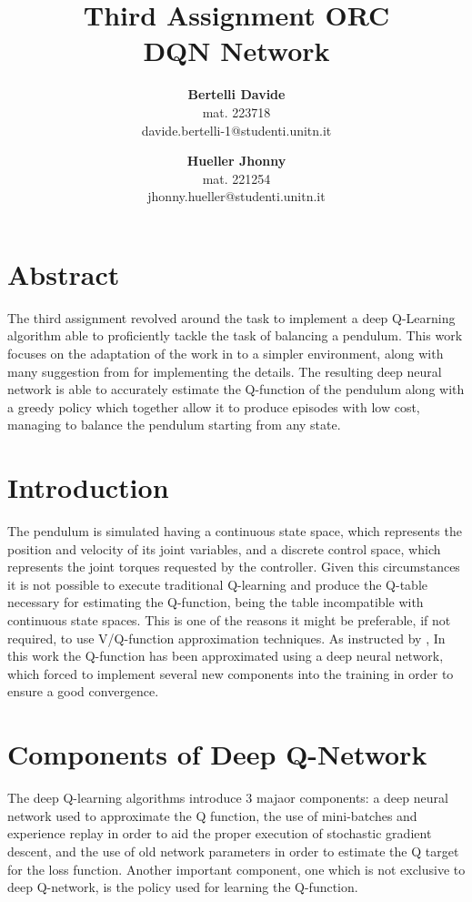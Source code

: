 \documentclass[twocolumn, a4paper]{article}
\begin{document}
\setlength{\textfloatsep}{0.3cm}
\setlength{\floatsep}{0.3cm}
\title{
	   \LARGE\textbf{Third Assignment ORC\\DQN Network}
	   \vspace{1cm}
	  }
\author{
		\textbf{Bertelli Davide} \\
		mat. 223718 \\
		davide.bertelli-1@studenti.unitn.it
		\and
		\textbf{Hueller Jhonny} \\
		mat. 221254\\
		jhonny.hueller@studenti.unitn.it
	   }
\date{}
\maketitle

\section{Abstract}
The third assignment revolved around the task to implement a deep Q-Learning
algorithm able to proficiently tackle the task of balancing a pendulum.
This work focuses on the adaptation of the work in \cite{Mnih} to a simpler
environment, along with many suggestion from \cite{Roderick} for
implementing the details.
The resulting deep neural network is able to accurately estimate the Q-function
of the pendulum along with a greedy policy which together allow it to produce 
episodes with low cost, managing to balance the pendulum starting from any state.

\section{Introduction}
The pendulum is simulated having a continuous state space, which represents
the position and velocity of its joint variables, and a discrete control
space, which represents the joint torques requested by the controller.
Given this circumstances it is not possible to execute traditional Q-learning
and produce the Q-table necessary for estimating the Q-function, being the table
incompatible with continuous state spaces.
This is one of the reasons it might be preferable, if not required, to use
V/Q-function approximation techniques.
As instructed by \cite{Roderick}, In this work the Q-function has been
approximated using a deep neural network, which forced to implement several
new components into the training in order to ensure a good convergence.

\section{Components of Deep Q-Network}
The deep Q-learning algorithms introduce 3 majaor components: a deep neural
network used to approximate the Q function, the use of mini-batches and
experience replay in order to aid the proper execution of stochastic gradient
descent, and the use of old network parameters in order to estimate the Q
target for the loss function\cite{Roderick}. Another important component,
one which is not exclusive to deep Q-network, is the policy used for learning
the Q-function.
\end{document}
